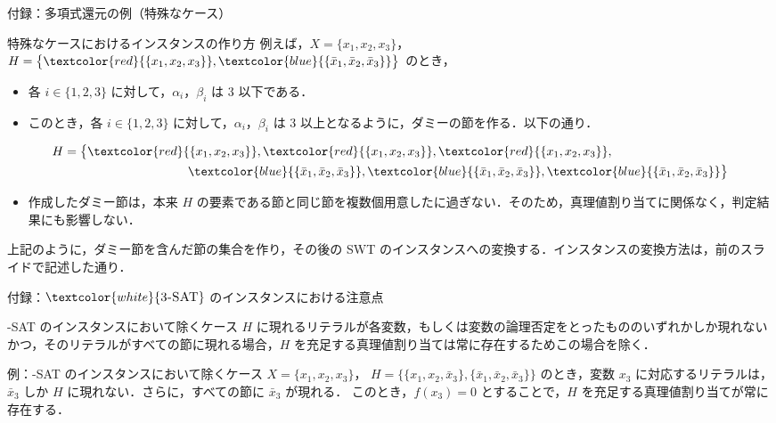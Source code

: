 \documentclass[dvipdfmx]{beamer}
\begin{document}
    \begin{frame}{付録：多項式還元の例（特殊なケース）}
      \begin{block}{特殊なケースにおけるインスタンスの作り方}
        例えば，$X = \{x_1,x_2,x_3\}$，$H = \big\{{\textcolor{red}{\{x_1,x_2,x_3\}}},{\textcolor{blue}{\{\bar x_1, \bar x_2, \bar x_3\}}}\big\}$ のとき，
        \begin{itemize}
          \item
          各 $i \in \{1,2,3\}$ に対して，$\alpha_i$，$\beta_i$ は 3 以下である．
          \item
          このとき，各 $i \in \{1,2,3\}$ に対して，$\alpha_i$，$\beta_i$ は 3 以上となるように，ダミーの節を作る．以下の通り．
        \end{itemize}
        \begin{equation}
          \begin{split}
            H &= \big\{
            {\textcolor{red}{\{x_1,x_2,x_3\}}},
            {\textcolor{red}{\{x_1,x_2,x_3\}}},
            {\textcolor{red}{\{x_1,x_2,x_3\}}},
            \\ & \qquad\qquad\qquad\qquad\qquad
            {\textcolor{blue}{\{\bar x_1, \bar x_2, \bar x_3\}}},
            {\textcolor{blue}{\{\bar x_1, \bar x_2, \bar x_3\}}},
            {\textcolor{blue}{\{\bar x_1, \bar x_2, \bar x_3\}}}
            \big\} \notag
          \end{split}
        \end{equation}
        \begin{itemize}
          \item 作成したダミー節は，本来 $H$ の要素である節と同じ節を複数個用意したに過ぎない．そのため，真理値割り当てに関係なく，判定結果にも影響しない．
        \end{itemize}
        上記のように，ダミー節を含んだ節の集合を作り，その後の SWT のインスタンスへの変換する．インスタンスの変換方法は，前のスライドで記述した通り．
      \end{block}
    \end{frame}

    \begin{frame}{付録：${\textcolor{white}{\mbox {\sc 3-SAT}}}$ のインスタンスにおける注意点}
      \begin{block}{{-SAT} のインスタンスにおいて除くケース}
        $H$ に現れるリテラルが各変数，もしくは変数の論理否定をとったもののいずれかしか現れないかつ，そのリテラルがすべての節に現れる場合，$H$ を充足する真理値割り当ては常に存在するためこの場合を除く．
      \end{block}

      \begin{exampleblock}{例：{-SAT} のインスタンスにおいて除くケース}
        $X = \{x_1,x_2,x_3\}$，
        $H = \big\{\{x_1,x_2,\bar x_3\}, \{\bar x_1, \bar x_2, \bar x_3\}\big\}$ のとき，変数 $x_3$ に対応するリテラルは，$\bar x_3$ しか $H$ に現れない．さらに，すべての節に $\bar x_3$ が現れる．
        このとき，$f(x_3) = 0$ とすることで，$H$ を充足する真理値割り当てが常に存在する．
      \end{exampleblock}
    \end{frame}
\end{document}
